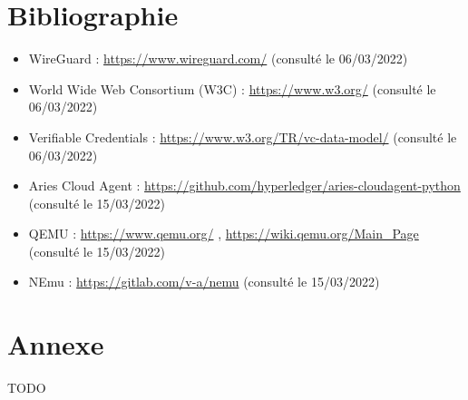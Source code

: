 \documentclass[12pt, openany]{report}
\begin{document}
\section{Bibliographie}
\noindent 
\begin{itemize}

\item WireGuard : \url{https://www.wireguard.com/} (consulté le 06/03/2022) 
\item World Wide Web Consortium (W3C) : \url{https://www.w3.org/} (consulté le 06/03/2022)
\item Verifiable Credentials : \url{https://www.w3.org/TR/vc-data-model/} (consulté le 06/03/2022) 
\item Aries Cloud Agent : \url{https://github.com/hyperledger/aries-cloudagent-python} (consulté le 15/03/2022)
\item QEMU : \url{https://www.qemu.org/} , \url{https://wiki.qemu.org/Main_Page} (consulté le 15/03/2022)
\item NEmu : \url{https://gitlab.com/v-a/nemu} (consulté le 15/03/2022)

\end{itemize}

\section{Annexe}
\noindent 
\begin{flushleft}
TODO
\end{flushleft}
\end{document}

